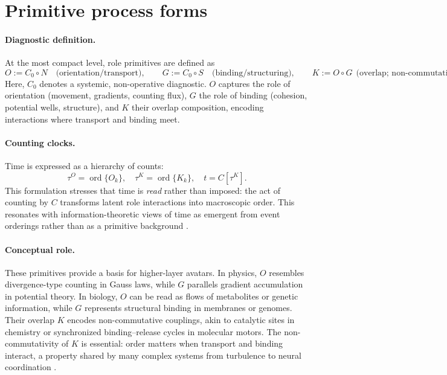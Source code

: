 \documentclass[12pt,a4paper,oneside]{scrreprt}
\begin{document}
\section{Primitive process forms}\label{sec:ur-primitives}

\paragraph{Diagnostic definition.} 
At the most compact level, role primitives are defined as
\begin{equation}
O := C_0 \!\circ N \quad \text{(orientation/transport)}, 
\qquad
G := C_0 \!\circ S \quad \text{(binding/structuring)}, 
\qquad
K := O \!\circ G \ \ \text{(overlap; non-commutative)}.
\end{equation}
Here, $C_0$ denotes a systemic, non-operative diagnostic. 
$O$ captures the role of orientation (movement, gradients, counting flux), 
$G$ the role of binding (cohesion, potential wells, structure), 
and $K$ their overlap composition, encoding interactions where transport and binding meet. 

\paragraph{Counting clocks.} 
Time is expressed as a hierarchy of counts: 
\[
\tau^O = \operatorname{ord}\{O_k\}, \quad 
\tau^K = \operatorname{ord}\{K_k\}, \quad 
t = C[\tau^K].
\]
This formulation stresses that time is \emph{read} rather than imposed: 
the act of counting by $C$ transforms latent role interactions into macroscopic order. 
This resonates with information-theoretic views of time as emergent from event orderings 
rather than as a primitive background \citep{Rovelli1995Time}.

\paragraph{Conceptual role.} 
These primitives provide a basis for higher-layer avatars. 
In physics, $O$ resembles divergence-type counting in Gauss laws, 
while $G$ parallels gradient accumulation in potential theory. 
In biology, $O$ can be read as flows of metabolites or genetic information, 
while $G$ represents structural binding in membranes or genomes. 
Their overlap $K$ encodes non-commutative couplings, akin to catalytic sites in chemistry 
or synchronized binding–release cycles in molecular motors. 
The non-commutativity of $K$ is essential: order matters when transport and binding interact, 
a property shared by many complex systems from turbulence to neural coordination \citep{Laughlin2000Emergent}.
\end{document}

